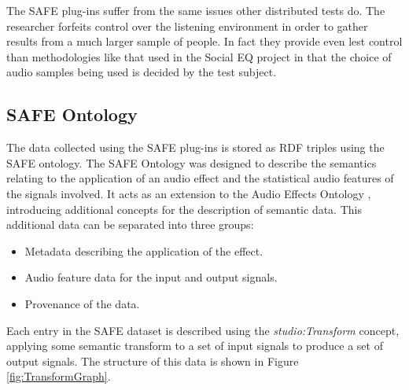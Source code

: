 		The SAFE plug-ins suffer from the same issues other distributed tests do. The researcher forfeits control
		over the listening environment in order to gather results from a much larger sample of people. In fact they
		provide even lest control than methodologies like that used in the Social EQ project
		\citep{cartwright2013socialeq} in that the choice of audio samples being used is decided by the test
		subject. 

	\subsection{SAFE Ontology}
	\label{sec:TimbreEvaluation-DAWBasedTimbreEvaluation-SAFEOntology}

		The data collected using the SAFE plug-ins is stored as RDF triples using the SAFE ontology.  The SAFE
		Ontology was designed to describe the semantics relating to the application of an audio effect and the
		statistical audio features of the signals involved. It acts as an extension to the Audio Effects Ontology
		\citep{wilmering2013the}, introducing additional concepts for the description of semantic data.  This
		additional data can be separated into three groups:

		\begin{itemize}
			\item Metadata describing the application of the effect.
			\item Audio feature data for the input and output signals.
			\item Provenance of the data.
		\end{itemize}

		Each entry in the SAFE dataset is described using the \emph{studio:Transform} concept, applying some
		semantic transform to a set of input signals to produce a set of output signals. The structure of this data
		is shown in Figure \ref{fig:TransformGraph}.

